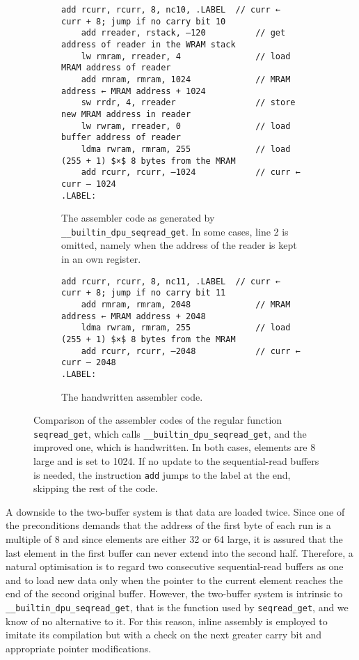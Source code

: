 \begin{figure}[t]
	\begin{subfigure}{\textwidth}
		\begin{lstlisting}[language={[DPU]Assembler}, mathescape, keepspaces]
	add rcurr, rcurr, 8, nc10, .LABEL  // curr ← curr + 8; jump if no carry bit 10
	add rreader, rstack, –120          // get address of reader in the WRAM stack
	lw rmram, rreader, 4               // load MRAM address of reader
	add rmram, rmram, 1024             // MRAM address ← MRAM address + 1024
	sw rrdr, 4, rreader                // store new MRAM address in reader
	lw rwram, rreader, 0               // load buffer address of reader
	ldma rwram, rmram, 255             // load (255 + 1) $×$ 8 bytes from the MRAM
	add rcurr, rcurr, –1024            // curr ← curr – 1024
.LABEL:\end{lstlisting}
		\caption{
			The assembler code as generated by \lstinline|__builtin_dpu_seqread_get|.
			In some cases, line 2 is omitted, namely when the address of the reader is kept in an own register.
		}
		\label{fig:mram:assembler:auto}
	\end{subfigure}

	\begin{subfigure}{\textwidth}
		\begin{lstlisting}[language={[DPU]Assembler}, mathescape, keepspaces]
	add rcurr, rcurr, 8, nc11, .LABEL  // curr ← curr + 8; jump if no carry bit 11
	add rmram, rmram, 2048             // MRAM address ← MRAM address + 2048
	ldma rwram, rmram, 255             // load (255 + 1) $×$ 8 bytes from the MRAM
	add rcurr, rcurr, –2048            // curr ← curr – 2048
.LABEL:\end{lstlisting}
		\caption{
			The handwritten assembler code.
		}
		\label{fig:mram:assembler:manual}
	\end{subfigure}
	\caption{
		Comparison of the assembler codes of the regular function \lstinline|seqread_get|, which calls \lstinline|__builtin_dpu_seqread_get|, and the improved one, which is handwritten.
		In both cases, elements are \qty{8}{\byte} large and \seqreadcachesize{} is set to 1024.
		If no update to the sequential-read buffers is needed, the instruction \lstinline|add| jumps to the label at the end, skipping the rest of the code.
	}
	\label{fig:mram:assembler}
\end{figure}

A downside to the two-buffer system is that data are loaded twice.
Since one of the preconditions demands that the address of the first byte of each run is a multiple of 8 and since elements are either \qty{32}{\bit} or \qty{64}{\bit} large, it is assured that the last element in the first buffer can never extend into the second half.
Therefore, a natural optimisation is to regard two consecutive sequential-read buffers as one and to load new data only when the pointer to the current element reaches the end of the second original buffer.
However, the two-buffer system is intrinsic to \lstinline|__builtin_dpu_seqread_get|, that is the function used by \lstinline|seqread_get|, and we know of no alternative to it.
For this reason, inline assembly is employed to imitate its compilation but with a check on the next greater carry bit and appropriate pointer modifications.

